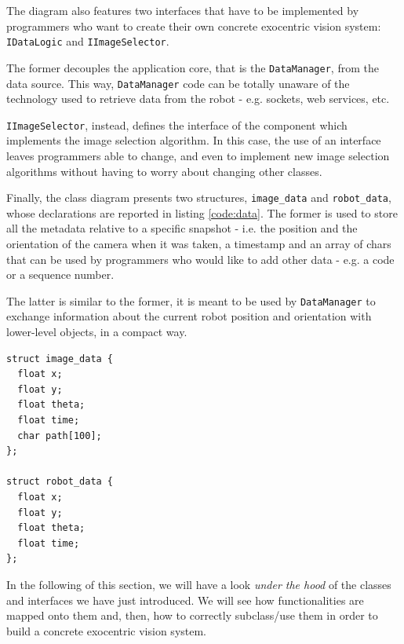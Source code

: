 %
The diagram also features two interfaces that have to be implemented 
by programmers who want to create their own concrete exocentric 
vision system: \texttt{IDataLogic} and 
\texttt{IImageSelector}.
%

%
The former decouples the application 
core, that is the \texttt{DataManager}, from the data source.
This way, \texttt{DataManager} code can be totally unaware of 
the technology used to retrieve data from the robot - e.g. 
sockets, web services, etc.
%

%
\texttt{IImageSelector}, instead, defines the interface 
of the component which implements the image selection algorithm.
%
In this case, the use of an interface leaves programmers 
able to change, and even to implement new image 
selection algorithms without having to worry about
changing other classes.
%

%
Finally, the class diagram presents two structures, 
\texttt{image\_data} and \texttt{robot\_data}, whose 
declarations are reported in listing \ref{code:data}.
%
The former is used to store all the metadata 
relative to a specific snapshot - i.e. the position 
and the orientation of the camera when it was taken, 
a timestamp and an array of chars that can be used by 
programmers who would like to add other data - e.g. 
a code or a sequence number.
%

%
The latter is similar to the former, it is meant to be 
used by \texttt{DataManager} to exchange information
about the current robot position and orientation with 
lower-level objects, in a compact way.
%
\begin{lstlisting}[caption={\framework{} data structures}, label={code:data}, frame=trBL]
struct image_data {
  float x;
  float y;
  float theta;
  float time;
  char path[100];
};

struct robot_data {
  float x;
  float y;
  float theta;
  float time;
};
\end{lstlisting}
%

%
In the following of this section, we will have a look 
\textit{under the hood} of the classes and interfaces 
we have just introduced.
%
We will see how \framework{} functionalities are 
mapped onto them and, then, how to correctly subclass/use
them in order to build a concrete exocentric vision system.
%

%
